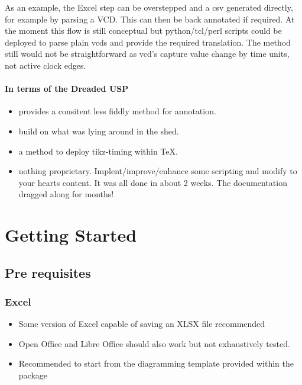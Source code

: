 \documentclass[letterpaper,10pt,english]{sphinxmanual}
\begin{document}
As an example, the Excel step can be overstepped and a csv generated directly,
for example by parsing a VCD. This can then be back annotated if required. At
the moment this flow is still conceptual but python/tcl/perl scripts could be
deployed to parse plain vcds and provide the required translation. The method
still would not be straightforward as vcd’s capture value change by time units,
not active clock edges.


\subsubsection{In terms of the Dreaded USP}
\label{\detokenize{intro:in-terms-of-the-dreaded-usp}}\begin{itemize}
\item {} 
provides a consitent less fiddly method for annotation.

\item {} 
build on what was lying around in the shed.

\item {} 
a method to deploy tikz-timing within TeX.

\item {} 
nothing proprietary. Implent/improve/enhance some scripting and modify to your hearts content. It was all done in about 2 weeks. The documentation dragged along for  months!

\end{itemize}


\chapter{Getting Started}
\label{\detokenize{intro:getting-started}}

\section{Pre requisites}
\label{\detokenize{intro:pre-requisites}}

\subsection{Excel}
\label{\detokenize{intro:excel}}\begin{itemize}
\item {} 
Some version of Excel capable of saving an XLSX file recommended

\item {} 
Open Office and Libre Office should also work but not exhaustively tested.

\item {} 
Recommended to start from the diagramming template provided within the
package

\end{itemize}
\end{document}
